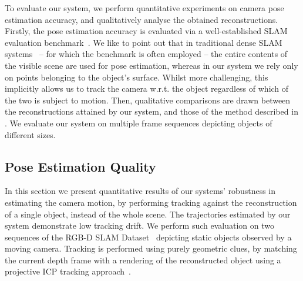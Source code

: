 To evaluate our system, we perform quantitative experiments on camera pose estimation accuracy, and qualitatively analyse the obtained reconstructions.
Firstly, the pose estimation accuracy is evaluated via a well-established SLAM evaluation benchmark~\cite{sturm12iros}.
We like to point out that %
in traditional dense SLAM systems~\cite{Prisacariu2014,Niessner2013,Newcombe2011} -- for which the benchmark is often employed -- the entire contents of the visible scene are used for pose estimation, whereas in our system we rely only on points belonging to the object's surface.
Whilst more challenging, this implicitly allows us to track the camera w.r.t. the object regardless of which of the two is subject to motion.
Then, qualitative comparisons are drawn between the reconstructions attained by our system, and those of the method described in \cite{Ren2013}.
We evaluate our system on multiple frame sequences depicting objects of different sizes. %


\subsection{Pose Estimation Quality}
In this section we present quantitative results of our systems' %
robustness in estimating the camera motion, by performing tracking against the reconstruction of a single object, instead of the whole scene.
The trajectories estimated by our system demonstrate low tracking drift. %
We perform such evaluation on two sequences of the RGB-D SLAM Dataset~\cite{sturm12iros} depicting static objects observed by a moving camera.
Tracking is performed using purely geometric clues, by matching the current depth frame with a rendering of the reconstructed object using a projective ICP tracking approach~\cite{Kahler2016}.

